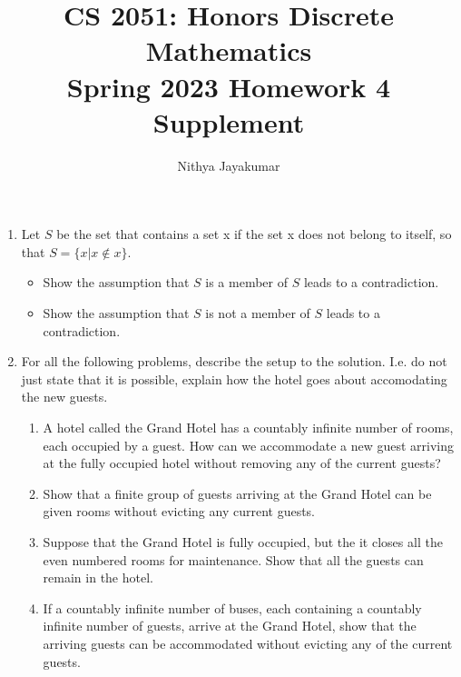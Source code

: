 \documentclass{article}
\title{\vspace{-1cm}CS 2051: Honors Discrete Mathematics \\Spring 2023 Homework 4 Supplement}
\author{Nithya Jayakumar }
\date{}
\begin{document}
\maketitle
\begin{enumerate}

\item Let $S$ be the set that contains a set x if the set x does not belong to itself, so that $S = \{x \vert x \not\in x\}.$
\begin{itemize}
    \item Show the assumption that $S$ is a member of $S$ leads to a contradiction.
    \item Show the assumption that $S$ is not a member of $S$ leads to a contradiction.
\end{itemize}

\item For all the following problems, describe the setup to the solution. I.e. do not just state that it is possible, explain how the hotel goes about accomodating the new guests.
\begin{enumerate}
    \item A hotel called the Grand Hotel has a countably infinite number of rooms, each occupied by a guest. How can we accommodate a new guest arriving at the fully occupied hotel without removing any of the current guests?
    \item Show that a finite group of guests arriving at the Grand Hotel can be given rooms without evicting any current guests.
    \item Suppose that the Grand Hotel is fully occupied, but the it closes all the even numbered rooms for maintenance. Show that all the guests can remain in the hotel.
    \item If a countably infinite number of buses, each containing a countably infinite number of guests, arrive at the Grand Hotel, show that the arriving guests can be accommodated without evicting any of the current guests.
    \end{enumerate}

\end{enumerate}
\end{document}
